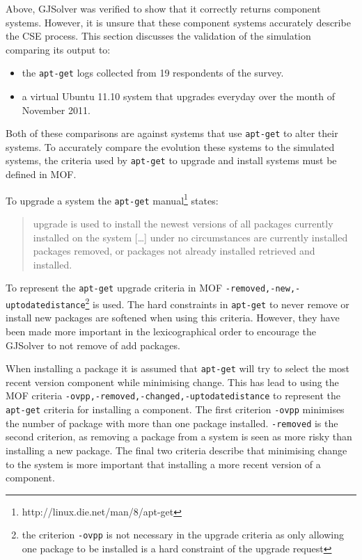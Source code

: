 Above, GJSolver was verified to show that it correctly returns component systems.
However, it is unsure that these component systems accurately describe the CSE process.
This section discusses the validation of the simulation comparing its output to:
\begin{itemize}
  \item the \texttt{apt-get} logs collected from 19 respondents of the survey.
  \item a virtual Ubuntu 11.10 system that upgrades everyday over the month of November 2011.
\end{itemize}
Both of these comparisons are against systems that use \texttt{apt-get} to alter their systems.
To accurately compare the evolution these systems to the simulated systems, the criteria used by \texttt{apt-get} to upgrade and install systems must be defined in MOF.

To upgrade a system the \texttt{apt-get} manual\footnote{http://linux.die.net/man/8/apt-get} states:
\begin{quotation}
upgrade is used to install the newest versions of all packages currently installed on the system 
[\ldots] 
under no circumstances are currently installed packages removed, or packages not already installed retrieved and installed.
\end{quotation}
To represent the \texttt{apt-get} upgrade criteria in MOF 
\texttt{-removed,-new,-uptodatedistance}\footnote{the criterion \texttt{-ovpp} is not necessary in the upgrade criteria 
as only allowing one package to be installed is a hard constraint of the upgrade request} 
is used.
The hard constraints in \texttt{apt-get} to never remove or install new packages are softened when using this criteria.
However, they have been made more important in the lexicographical order to encourage the GJSolver to not remove of add packages.

When installing a package it is assumed that \texttt{apt-get} will try to select the most recent version component while minimising change.
This has lead to using the MOF criteria \texttt{-ovpp,-removed,-changed,-uptodatedistance} to represent the \texttt{apt-get} criteria for installing a component.
The first criterion \texttt{-ovpp} minimises the number of package with more than one package installed.
\texttt{-removed} is the second criterion, as removing a package from a system is seen as more risky than installing a new package.
The final two criteria describe that minimising change to the system is more important that installing a more recent version of a component.

